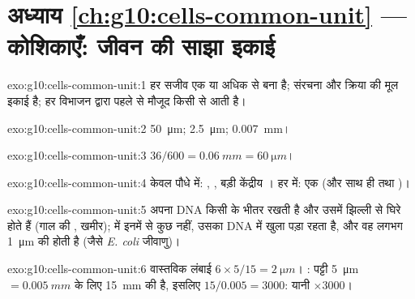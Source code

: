 \section*{अध्याय \ref{ch:g10:cells-common-unit} --- कोशिकाएँ: जीवन की साझा इकाई}

\begin{solution}{exo:g10:cells-common-unit:1}
हर सजीव एक या अधिक  से बना है;  संरचना और क्रिया की मूल
इकाई है; हर  विभाजन द्वारा पहले से मौजूद किसी  से आती है।
\end{solution}

\begin{solution}{exo:g10:cells-common-unit:2}
\qty{50}{\micro m}; \qty{2.5}{\micro m}; \qty{0.007}{mm}।
\end{solution}

\begin{solution}{exo:g10:cells-common-unit:3}
$36/600 = \qty{0.06}{mm} = \qty{60}{\micro m}$।
\end{solution}

\begin{solution}{exo:g10:cells-common-unit:4}
केवल पौधे में: , , बड़ी केंद्रीय । हर 
में: एक  (और साथ ही  तथा )।
\end{solution}

\begin{solution}{exo:g10:cells-common-unit:5}
 अपना DNA किसी  के भीतर रखती है और उसमें झिल्ली
से घिरे  होते हैं (गाल की , खमीर); 
में इनमें से कुछ नहीं, उसका DNA  में खुला पड़ा रहता है, और
वह लगभग \qty{1}{\micro m} की होती है (जैसे \emph{E. coli} जीवाणु)।
\end{solution}

\begin{solution}{exo:g10:cells-common-unit:6}
वास्तविक लंबाई $6 \times 5/15 = \qty{2}{\micro m}$। : पट्टी
\qty{5}{\micro m} $= \qty{0.005}{mm}$ के लिए \qty{15}{mm} की है, इसलिए
$15/0.005 = 3000$: यानी $\times 3000$।
\end{solution}


